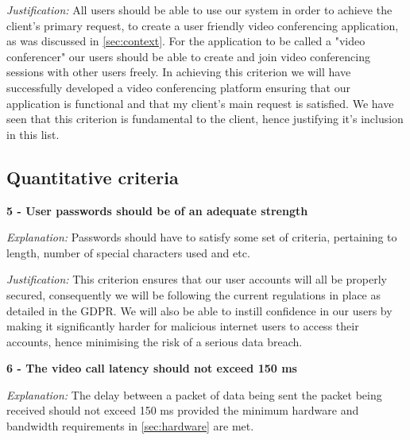 \vspace{0.1cm}

\textit{Justification:}
All users should be able to use our system in order to 
achieve the client's primary request, to create a user
friendly video conferencing application, as was discussed
in \ref{sec:context}. For the application to be called a 
"video conferencer" our users should be able to create and
join video conferencing sessions with other users freely.
In achieving this criterion we will have successfully 
developed a video conferencing platform ensuring that our 
application is functional and that my client's main request
is satisfied. We have seen that this criterion is fundamental
to the client, hence justifying it's inclusion in this list.\\

\subsection{Quantitative criteria}

\textsf{\bfseries 5 - User passwords should be of an adequate strength}

\vspace{0.1cm}

\textit{Explanation:} Passwords should have to satisfy some 
set of criteria, pertaining to length, number of special 
characters used and etc.

\vspace{0.1cm}

\textit{Justification:}
This criterion ensures that our user accounts will all 
be properly secured, consequently we will be following 
the current regulations in place as detailed in the 
GDPR. We will also be able to instill confidence in our 
users by making it significantly harder for malicious 
internet users to access their accounts, hence minimising 
the risk of a serious data breach.

\vspace{0.2cm}

\textsf{\bfseries 6 - The video call latency should not exceed 150 ms}

\vspace{0.1cm}

\textit{Explanation:}
The delay between a packet of data being sent the packet 
being received should not exceed 150 ms provided the minimum
hardware and bandwidth requirements in \ref{sec:hardware} 
are met.

\vspace{0.1cm}

